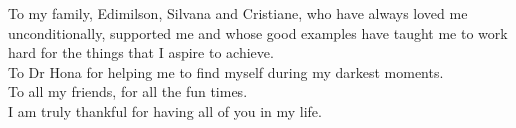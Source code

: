 To my family, Edimilson, Silvana and Cristiane, who have always loved me unconditionally, supported me and whose good examples have taught me to work hard for the things that I aspire to achieve.\\
To Dr Hona for helping me to find myself during my darkest moments.\\
To all my friends, for all the fun times.\\
I am truly thankful for having all of you in my life.
 
